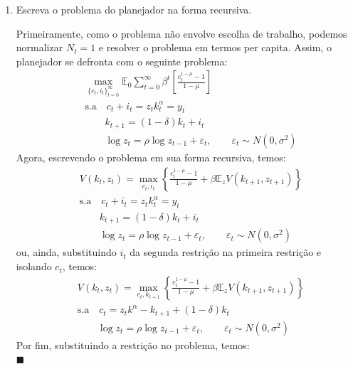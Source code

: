 \documentclass[10pt]{article}
\newcommand*{\QEDA}{\hfill\ensuremath{\blacksquare}}%
\newcommand\E{\mathbb{E}}
\newcommand\0{\mathbf{0}}
\newcounter{exercise}
\newcounter{problem}[exercise]
\newenvironment{sol}
    {\\[1em] {\color{magenta}\text{Resposta.}}
    }
    {{\color{blue!50!black}\QEDA}}
\begin{document}
\begin{enumerate}[wide] 

\item Escreva o problema do planejador na forma recursiva.
\begin{sol}
Primeiramente, como o problema não envolve escolha de trabalho, podemos normalizar $N_t = 1$ e resolver o problema em termos per capita. Assim, o planejador se defronta com o seguinte problema: 
\begin{equation}
\begin{aligned}
&\max_{\{c_t, i_t\}_{t= 0}^{\infty}} \E_0 \sum_{t=0}^\infty \beta^t \left[\frac{c_t^{1-\mu} - 1}{1 - \mu}\right] \\[1em]
&\text{s.a} \quad c_t + i_t = z_t k_t^\alpha = y_t \\[1em]
&\qquad  k_{t+1} = (1-\delta)k_t + i_t \\[1em] 
&\qquad \log z_t = \rho \log z_{t-1} + \varepsilon_t, \qquad \varepsilon_t \sim N(0, \sigma^2)
\end{aligned}
\end{equation}
Agora, escrevendo o problema em sua forma recursiva, temos: 
\begin{equation}
\begin{aligned}
&V(k_t, z_t) = \max_{c_t, i_t} \left\{ \frac{c_t^{1-\mu} - 1}{1 - \mu}  + \beta \E_{z} V({k_{t+1}, z_{t+1}})\right\} \\[1em]
&\text{s.a} \quad c_t + i_t = z_t k_t^\alpha = y_t \\[1em]
&\qquad  k_{t+1} = (1-\delta)k_t + i_t \\[1em] 
&\qquad \log z_t = \rho \log z_{t-1} + \varepsilon_t, \qquad \varepsilon_t \sim N(0, \sigma^2)
\end{aligned}
\end{equation}
ou, ainda, substituindo $i_t$ da segunda restrição na primeira restrição e isolando $c_t$, temos:
\begin{equation}
\begin{aligned}
&V(k_t, z_t) = \max_{c_t, k_{t+1}} \left\{ \frac{c_t^{1-\mu} - 1}{1 - \mu}  + \beta \E_{z}V({k_{t+1}, z_{t+1}})\right\} \\[1em]
&\text{s.a} \quad c_t  =  z_t k^\alpha - k_{t+1} + (1-\delta)k_t  \\[1em]
&\qquad \log z_t = \rho \log z_{t-1} + \varepsilon_t, \qquad \varepsilon_t \sim N(0, \sigma^2)
\end{aligned}
\end{equation}
Por fim, substituindo a restrição no problema, temos:
\begin{equation}

\end{equation}
\end{sol}
\end{enumerate}
\end{document}
